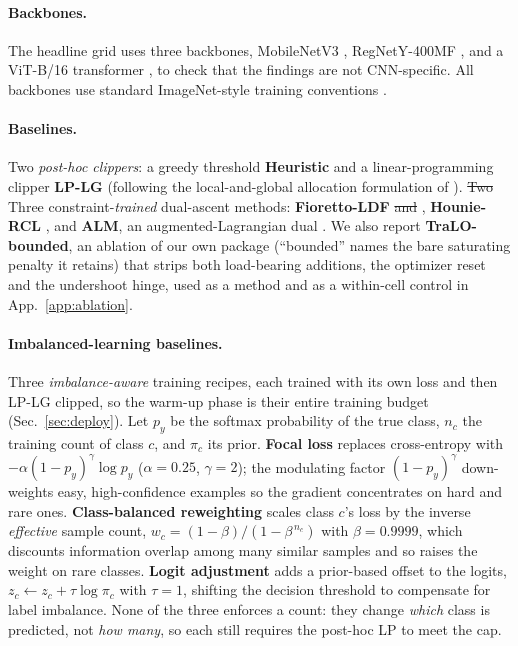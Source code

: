 \documentclass[10pt]{article}
\newcommand{\del}[1]{{\color{red}\sout{#1}}}
\begin{document}
\paragraph{Backbones.}
The headline grid uses three backbones, MobileNetV3
\citep{howard2019searching}, RegNetY-400MF \citep{radosavovic2020designing},
and a ViT-B/16 transformer \citep{dosovitskiy2020image}, to check that the
findings are not CNN-specific. All backbones use standard ImageNet-style
training conventions \citep{he2016deep}.

\paragraph{Baselines.}
Two \emph{post-hoc clippers}: a greedy threshold \textbf{Heuristic} and a
linear-programming clipper \textbf{LP-LG} (following the local-and-global
allocation formulation of \citealt{shifman2025classification}). \del{Two}%
{\color{blue}Three}
constraint-\emph{trained} dual-ascent
methods: \textbf{Fioretto-LDF} \citep{fioretto2020lagrangian}\del{ and}%
{\color{blue},}
\textbf{Hounie-RCL} \citep{hounie2023resilient}{\color{blue}, and \textbf{ALM},
an augmented-Lagrangian dual \citep{bertsekas1982constrained}}. We also report
\textbf{TraLO-bounded}, an ablation of our own package (``bounded'' names
the bare saturating penalty it retains) that strips both load-bearing
additions, the optimizer reset and the undershoot hinge, used as a method
and as a within-cell control in App.~\ref{app:ablation}.

{\color{blue}
\paragraph{Imbalanced-learning baselines.}
Three \emph{imbalance-aware} training recipes, each trained with its own loss and then
LP-LG clipped, so the warm-up phase is their entire training budget
(Sec.~\ref{sec:deploy}). Let $p_y$ be the softmax probability of the true class, $n_c$
the training count of class $c$, and $\pi_c$ its prior. \textbf{Focal loss}
\citep{lin2017focal} replaces cross-entropy with
$-\alpha(1-p_y)^{\gamma}\log p_y$ ($\alpha{=}0.25$, $\gamma{=}2$); the modulating factor
$(1-p_y)^{\gamma}$ down-weights easy, high-confidence examples so the gradient
concentrates on hard and rare ones. \textbf{Class-balanced reweighting}
\citep{cui2019class} scales class $c$'s loss by the inverse \emph{effective} sample
count, $w_c = (1-\beta)/(1-\beta^{\,n_c})$ with $\beta{=}0.9999$, which discounts
information overlap among many similar samples and so raises the weight on rare classes.
\textbf{Logit adjustment} \citep{menon2020long} adds a prior-based offset to the logits,
$z_c \leftarrow z_c + \tau\log\pi_c$ with $\tau{=}1$, shifting the decision threshold to
compensate for label imbalance. None of the three enforces a count: they change
\emph{which} class is predicted, not \emph{how many}, so each still requires the post-hoc
LP to meet the cap.}
\end{document}
